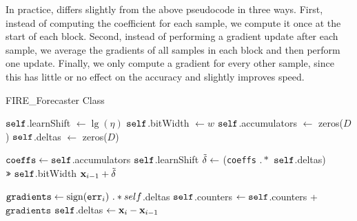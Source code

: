 In practice, \fire differs slightly from the above pseudocode in three ways. First, instead of computing the coefficient for each sample, we compute it once at the start of each block. Second, instead of performing a gradient update after each sample, we average the gradients of all samples in each block and then perform one update. Finally, we only compute a gradient for every other sample, since this has little or no effect on the accuracy and slightly improves speed.


\begin{algorithm}[h]
\caption{FIRE\_Forecaster Class} \label{algo:xff}
\begin{algorithmic}[1]

 \label{line:xffCtor}
\State $\texttt{self}$.learnShift $\leftarrow \lg(\eta)$
\State $\texttt{self}$.bitWidth $\leftarrow w$ 
\State $\texttt{self}$.accumulators $\leftarrow $ zeros($D$) \label{line:counter}
\State $\texttt{self}$.deltas $\leftarrow $ zeros($D$) \label{line:deltas}
\EndFunction

\State $\texttt{coeffs} \leftarrow \texttt{self}$.accumulators \rshift $\texttt{self}$.learnShift
\State $\tilde{\mathbf{\delta}} \leftarrow$ (\texttt{coeffs} $.*$ $\texttt{self}$.deltas) $\texttt{>>}\text{ } \texttt{self}$.bitWidth
\RETURN $\mathbf{x}_{i-1} + \tilde{\mathbf{\delta}}$
\EndFunction

\State $\texttt{gradients} \leftarrow \operatorname{sign}(\texttt{err}_i) \text{ } .* self$.deltas
\State $\texttt{self}$.counters $\leftarrow \texttt{self}$.counters + $\texttt{gradients}$
\State $\texttt{self}$.deltas $\leftarrow \mathbf{x}_{i} - \mathbf{x}_{i-1}$
\EndFunction


\end{algorithmic}
\end{algorithm}




